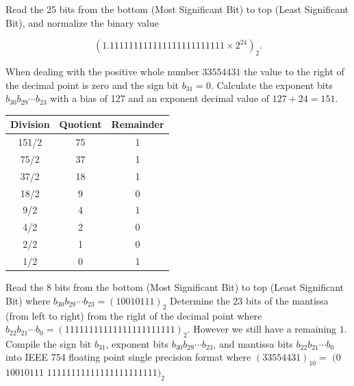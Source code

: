 \documentclass[main.tex]{subfiles}
\begin{document}
\begin{enumerate}
\begin{enumerate}
\begin{enumerate}
        \medskip
        
        Read the 25 bits from the bottom (Most Significant Bit) to top (Least Significant Bit), and normalize the binary value 
        
        $$
        (1.111111111111111111111111 \times 2^{24})_2.
        $$
        
        When dealing with the positive whole number $33554431$ the value to the right of the decimal point is zero and the sign bit $b_{31} = 0$. Calculate the exponent bits $b_{30} b_{29} \cdots b_{23}$ with a bias of 127 and an exponent decimal value of $127+24=151$.
        
        \medskip
        
        \begin{center}
        \begin{tabular}{ |c c c| } 
            \hline
            Division & Quotient & Remainder\\  
            \hline\hline
            151/2 & 75 & 1 \\ 
            \hline
            75/2 & 37 & 1 \\ 
            \hline
            37/2 & 18 & 1 \\ 
            \hline
            18/2 & 9 & 0 \\ 
            \hline
            9/2 & 4 & 1 \\ 
            \hline
            4/2 & 2 & 0 \\ 
            \hline
            2/2 & 1 & 0 \\ 
            \hline
            1/2 & 0 & 1 \\ 
            \hline
        \end{tabular}
        \end{center}
        
        \medskip
        
        Read the 8 bits from the bottom (Most Significant Bit) to top (Least Significant Bit) where $b_{30}b_{29} \cdots b_{23} = (10010111)_2$ Determine the 23 bits of the mantissa (from left to right) from the right of the decimal point where $b_{22}b_{21} \cdots b_{0} = (11111111111111111111111)_{2}$. However we still have a remaining $1$. Compile the sign bit $b_{31}$, exponent bits $b_{30}b_{29} \cdots b_{23}$, and mantissa bits $b_{22}b_{21} \cdots b_{0}$ into IEEE 754 floating point single precision format where $(33554431)_{10} =$ $(0$ $10010111$ $11111111111111111111111)_2$ 
    \end{enumerate}
    

\end{enumerate}
\end{enumerate}
\end{document}
